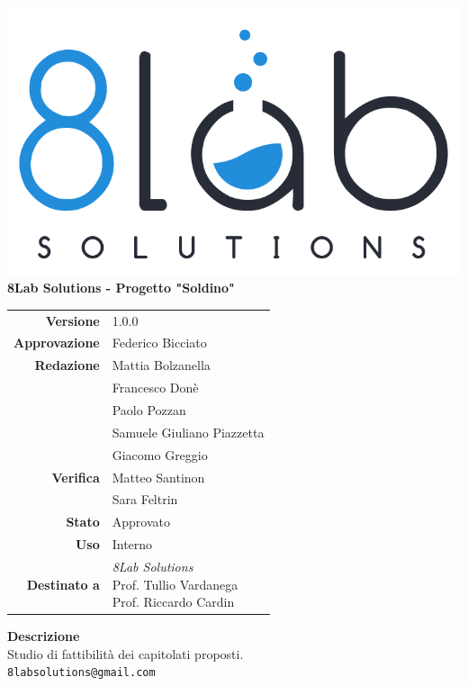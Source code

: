 \thispagestyle{empty}
\begin{titlepage}
	\begin{center}
		\includegraphics[scale = 0.3]{res/images/logo8_crop.png}\\
		\large \textbf{8Lab Solutions - Progetto "Soldino"} \\
		\vfill
		\Huge \textbf{\doctitle}
		\vspace*{\fill}
        
        \vfill
        \large
        \begin{tabular}{r|l}
                        \textbf{Versione} & 1.0.0 \\
                        \textbf{Approvazione} & Federico Bicciato \\
                        \textbf{Redazione} &  Mattia Bolzanella \\ &
                        	Francesco Donè\\&
                        	Paolo Pozzan\\&
                        	Samuele Giuliano Piazzetta\\&
                        	Giacomo Greggio\\
                        \textbf{Verifica} & Matteo Santinon \\&
                        	Sara Feltrin \\
                        \textbf{Stato} & Approvato \\
                        \textbf{Uso} & Interno \\
                        \textbf{Destinato a} & \parbox[t]{5cm}{\textit{8Lab Solutions}
                        \\Prof. Tullio Vardanega\\Prof. Riccardo Cardin}
                \end{tabular}
                \vfill
                \normalsize
                \textbf{Descrizione}\\
                Studio di fattibilità dei capitolati proposti.\\
                \vfill
                \small
                \texttt{8labsolutions@gmail.com}
	\end{center}
\end{titlepage}